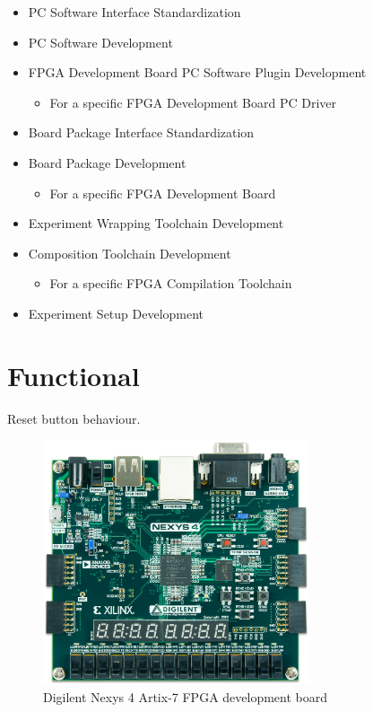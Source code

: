 \documentclass[openright]{uva-bachelor-thesis}
\begin{document}
\begin{itemize}
\item PC Software Interface Standardization
\item PC Software Development
\item FPGA Development Board PC Software Plugin Development
\begin{itemize}
\item For a specific FPGA Development Board PC Driver
\end{itemize}
\item Board Package Interface Standardization
\item Board Package Development
\begin{itemize}
\item For a specific FPGA Development Board
\end{itemize}
\item Experiment Wrapping Toolchain Development
\item Composition Toolchain Development
\begin{itemize}
\item For a specific FPGA Compilation Toolchain
\end{itemize}
\item Experiment Setup Development
\end{itemize}


\section{Functional}
Reset button behaviour.

\begin{figure}
\centering
\includegraphics[width=0.7\textwidth]{nexys4-small}
\caption{Digilent Nexys 4 Artix-7 FPGA development board}
\label{fig:nexys4}
\end{figure}
\end{document}
